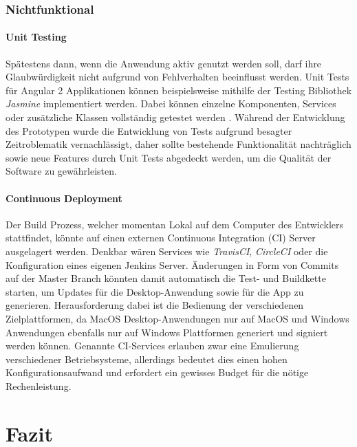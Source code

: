 \subsection{Nichtfunktional}


\subsubsection{Unit Testing}

Spätestens dann, wenn die Anwendung aktiv genutzt werden soll, darf ihre Glaubwürdigkeit nicht aufgrund von Fehlverhalten beeinflusst werden.
Unit Tests für Angular 2 Applikationen können beispielsweise mithilfe der Testing Bibliothek \emph{Jasmine} implementiert werden.
Dabei können einzelne Komponenten, Services oder zusätzliche Klassen vollständig getestet werden \cite{Angul78:online}.
Während der Entwicklung des Prototypen \projectname{} wurde die Entwicklung von Tests aufgrund besagter Zeitroblematik vernachlässigt,
daher sollte bestehende Funktionalität nachträglich sowie neue Features durch Unit Tests abgedeckt werden, um die Qualität der Software zu gewährleisten.

\subsubsection{Continuous Deployment}

Der Build Prozess, welcher momentan Lokal auf dem Computer des Entwicklers stattfindet, könnte auf einen externen Continuous Integration (CI) Server ausgelagert werden.
Denkbar wären Services wie \emph{TravisCI}, \emph{CircleCI} oder die Konfiguration eines eigenen Jenkins Server.
Änderungen in Form von Commits auf der Master Branch könnten damit automatisch die Test- und Buildkette starten, um Updates für die Desktop-Anwendung sowie für die App zu generieren.
Herausforderung dabei ist die Bedienung der verschiedenen Zielplattformen, da MacOS Desktop-Anwendungen nur auf MacOS und
Windows Anwendungen ebenfalls nur auf Windows Plattformen generiert und signiert werden können.
Genannte CI-Services erlauben zwar eine Emulierung verschiedener Betriebsysteme,
allerdings bedeutet dies einen hohen Konfigurationsaufwand und erfordert ein gewisses Budget für die nötige Rechenleistung.


\chapter{Fazit}

